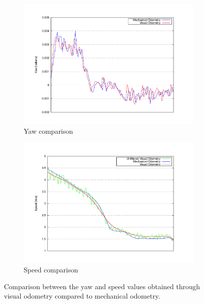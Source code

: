 \begin{figure}[p]
        \centering
        \begin{subfigure}[b]{\textwidth}
                \centering
                \includegraphics[width=\textwidth,height=0.4\textheight,trim=50 50 90 60, clip]{yaw}
                \caption{Yaw comparison}\label{fig:cp05_ego_yaw}
        \end{subfigure}
        
        \begin{subfigure}[b]{\textwidth}
                \centering
                \includegraphics[width=\textwidth,height=0.4\textheight,trim=50 50 90 60, clip]{speed}
                \caption{Speed comparison}\label{fig:cp05_ego_speed}
        \end{subfigure}%
        \caption{Comparison between the yaw and speed values obtained through visual odometry compared to mechanical odometry.}\label{fig:cp05_comparison_ego_yaw_speed}
\end{figure}

